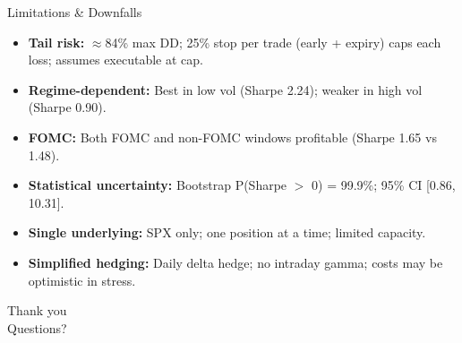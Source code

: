 \documentclass[11pt]{beamer}
\begin{document}
\begin{frame}{Limitations \& Downfalls}
  \begin{itemize}
    \item \textbf{Tail risk:} $\approx$84\% max DD; 25\% stop per trade (early + expiry) caps each loss; assumes executable at cap.
    \item \textbf{Regime-dependent:} Best in low vol (Sharpe 2.24); weaker in high vol (Sharpe 0.90).
    \item \textbf{FOMC:} Both FOMC and non-FOMC windows profitable (Sharpe 1.65 vs 1.48).
    \item \textbf{Statistical uncertainty:} Bootstrap P(Sharpe $>$ 0) = 99.9\%; 95\% CI [0.86, 10.31].
    \item \textbf{Single underlying:} SPX only; one position at a time; limited capacity.
    \item \textbf{Simplified hedging:} Daily delta hedge; no intraday gamma; costs may be optimistic in stress.
  \end{itemize}
\end{frame}

\begin{frame}[c]
  \centering \Large Thank you \\
  \vspace{1em}
  \normalsize Questions?
\end{frame}
\end{document}
